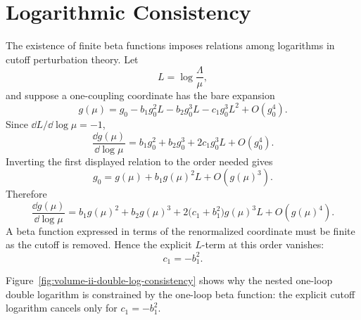 \section{Logarithmic Consistency}

The existence of finite beta functions imposes relations among logarithms in
cutoff perturbation theory.  Let
\[
  L=\log\frac{\Lambda}{\mu},
\]
and suppose a one-coupling coordinate has the bare expansion
\[
  g(\mu)
  =
  g_0-b_1g_0^2L-b_2g_0^3L-c_1g_0^3L^2+O(g_0^4).
\]
Since \(\dd L/\dd\log\mu=-1\),
\[
  \frac{\dd g(\mu)}{\dd\log\mu}
  =
  b_1g_0^2+b_2g_0^3+2c_1g_0^3L+O(g_0^4).
\]
Inverting the first displayed relation to the order needed gives
\[
  g_0=g(\mu)+b_1g(\mu)^2L+O(g(\mu)^3).
\]
Therefore
\[
  \frac{\dd g(\mu)}{\dd\log\mu}
  =
  b_1g(\mu)^2+b_2g(\mu)^3
  +
  2\bigl(c_1+b_1^2\bigr)g(\mu)^3L
  +
  O(g(\mu)^4).
\]
A beta function expressed in terms of the renormalized coordinate must be
finite as the cutoff is removed.  Hence the explicit \(L\)-term at this order
vanishes:
\[
  c_1=-b_1^2.
\]

Figure~\ref{fig:volume-ii-double-log-consistency} shows why the nested
one-loop double logarithm is constrained by the one-loop beta function: the
explicit cutoff logarithm cancels only for \(c_1=-b_1^2\).

